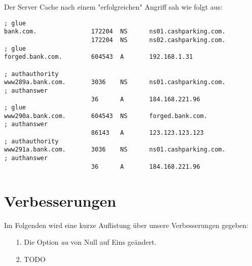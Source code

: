 \documentclass[10pt,a4paper]{article}
\begin{document}
Der Server Cache nach einem "erfolgreichen" Angriff sah wie folgt aus:
\begin{center}
\begin{lstlisting}
; glue
bank.com.               172204  NS      ns01.cashparking.com.
						172204  NS      ns02.cashparking.com.
; glue
forged.bank.com.        604543  A       192.168.1.31

; authauthority
www289a.bank.com.       3036    NS      ns01.cashparking.com.
; authanswer
						36      A       184.168.221.96
; glue
www290a.bank.com.       604543  NS      forged.bank.com.
; authanswer
						86143   A       123.123.123.123
; authauthority
www291a.bank.com.       3036    NS      ns01.cashparking.com.
; authanswer
						36      A       184.168.221.96
\end{lstlisting}
\end{center}

\section{Verbesserungen}
Im Folgenden wird eine kurze Auflistung über unsere Verbesserungen gegeben:
\begin{itemize}
	\item[1.]	Die Option \emph{aa} von Null auf Eins geändert. 
	\item[2.]	TODO
\end{itemize}
\end{document}
